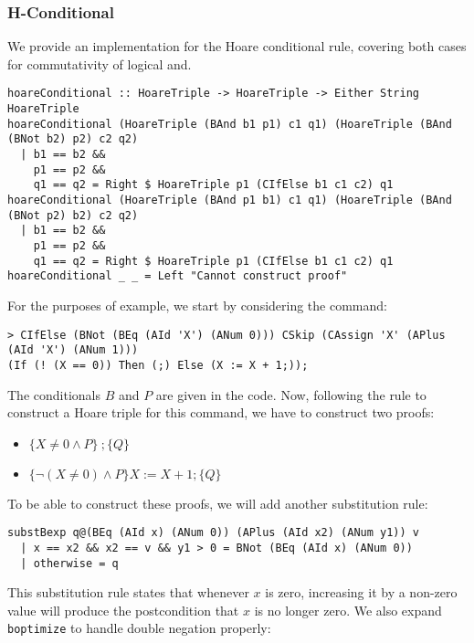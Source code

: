 \documentclass{article}
\begin{document}
\subsubsection{H-Conditional}

We provide an implementation for the Hoare conditional rule, covering both cases for commutativity of logical and.

\begin{lstlisting}
hoareConditional :: HoareTriple -> HoareTriple -> Either String HoareTriple
hoareConditional (HoareTriple (BAnd b1 p1) c1 q1) (HoareTriple (BAnd (BNot b2) p2) c2 q2)
  | b1 == b2 &&
    p1 == p2 &&
    q1 == q2 = Right $ HoareTriple p1 (CIfElse b1 c1 c2) q1
hoareConditional (HoareTriple (BAnd p1 b1) c1 q1) (HoareTriple (BAnd (BNot p2) b2) c2 q2)
  | b1 == b2 &&
    p1 == p2 &&
    q1 == q2 = Right $ HoareTriple p1 (CIfElse b1 c1 c2) q1
hoareConditional _ _ = Left "Cannot construct proof"
\end{lstlisting}

For the purposes of example, we start by considering the command:

\begin{lstlisting}
> CIfElse (BNot (BEq (AId 'X') (ANum 0))) CSkip (CAssign 'X' (APlus (AId 'X') (ANum 1)))
(If (! (X == 0)) Then (;) Else (X := X + 1;));
\end{lstlisting}

The conditionals $B$ and $P$ are given in the code. Now, following the rule to construct a Hoare triple for this command, we have to construct two proofs:

\begin{itemize}
\item $\{X \neq 0 \land P\} \ ; \{Q\}$
\item $\{\neg(X \neq 0) \land P\} X := X + 1; \{Q\}$
\end{itemize}

To be able to construct these proofs, we will add another substitution rule:

\begin{lstlisting}
substBexp q@(BEq (AId x) (ANum 0)) (APlus (AId x2) (ANum y1)) v
  | x == x2 && x2 == v && y1 > 0 = BNot (BEq (AId x) (ANum 0))
  | otherwise = q
\end{lstlisting}

This substitution rule states that whenever $x$ is zero, increasing it by a non-zero value will produce the postcondition that $x$ is no longer zero. We also expand \texttt{boptimize} to handle double negation properly:
\end{document}
